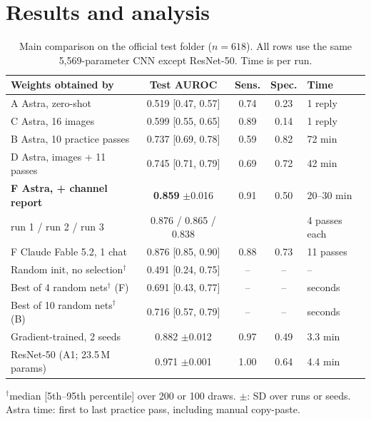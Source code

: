 \section{Results and analysis}
\begin{table}[t]
\centering
\caption{Main comparison on the official test folder ($n{=}618$). All rows use the same 5,569-parameter CNN except ResNet-50. Time is per run.}
\label{tab:main}
\setlength{\tabcolsep}{1.9pt}
\footnotesize
\begin{tabular}{@{}lcccl@{}}
\toprule
Weights obtained by & Test AUROC & Sens. & Spec. & Time \\
\midrule
A\; Astra, zero-shot & 0.519 {\scriptsize[0.47, 0.57]} & 0.74 & 0.23 & 1 reply \\
C\; Astra, 16 images & 0.599 {\scriptsize[0.55, 0.65]} & 0.89 & 0.14 & 1 reply \\
B\; Astra, 10 practice passes & 0.737 {\scriptsize[0.69, 0.78]} & 0.59 & 0.82 & 72 min \\
D\; Astra, images + 11 passes & 0.745 {\scriptsize[0.71, 0.79]} & 0.69 & 0.72 & 42 min \\
\textbf{F\; Astra, + channel report} & \textbf{0.859} {\scriptsize$\pm$0.016} & 0.91 & 0.50 & 20--30 min \\
\quad run 1 / run 2 / run 3 & {\scriptsize 0.876 / 0.865 / 0.838} & & & 4 passes each \\
F\; Claude Fable 5.2, 1 chat & 0.876 {\scriptsize[0.85, 0.90]} & 0.88 & 0.73 & 11 passes \\
\midrule
Random init, no selection$^\dagger$ & 0.491 {\scriptsize[0.24, 0.75]} & -- & -- & -- \\
Best of 4 random nets$^\dagger$ (F) & 0.691 {\scriptsize[0.43, 0.77]} & -- & -- & seconds \\
Best of 10 random nets$^\dagger$ (B) & 0.716 {\scriptsize[0.57, 0.79]} & -- & -- & seconds \\
Gradient-trained, 2 seeds & 0.882 {\scriptsize$\pm$0.012} & 0.97 & 0.49 & 3.3 min \\
ResNet-50 (A1; 23.5\,M params) & 0.971 {\scriptsize$\pm$0.001} & 1.00 & 0.64 & 4.4 min \\
\bottomrule
\end{tabular}

\vspace{2pt}
\raggedright\scriptsize $^\dagger$median [5th--95th percentile] over 200 or 100 draws. $\pm$: SD over runs or seeds. Astra time: first to last practice pass, including manual copy-paste.
\end{table}

